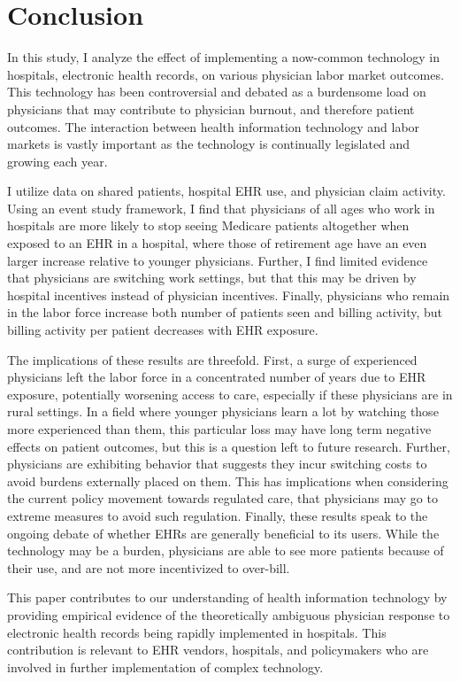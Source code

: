 \documentclass[11pt]{article}
\begin{document}
\section{Conclusion}

In this study, I analyze the effect of implementing a now-common technology in hospitals, electronic health records, on various physician labor market outcomes. This technology has been controversial and debated as a burdensome load on physicians that may contribute to physician burnout, and therefore patient outcomes. The interaction between health information technology and labor markets is vastly important as the technology is continually legislated and growing each year.

I utilize data on shared patients, hospital EHR use, and physician claim activity. Using an event study framework, I find that physicians of all ages who work in hospitals are more likely to stop seeing Medicare patients altogether when exposed to an EHR in a hospital, where those of retirement age have an even larger increase relative to younger physicians. Further, I find limited evidence that physicians are switching work settings, but that this may be driven by hospital incentives instead of physician incentives. Finally, physicians who remain in the labor force increase both number of patients seen and billing activity, but billing activity per patient decreases with EHR exposure. 

The implications of these results are threefold. First, a surge of experienced physicians left the labor force in a concentrated number of years due to EHR exposure, potentially worsening access to care, especially if these physicians are in rural settings. In a field where younger physicians learn a lot by watching those more experienced than them, this particular loss may have long term negative effects on patient outcomes, but this is a question left to future research. Further, physicians are exhibiting behavior that suggests they incur switching costs to avoid burdens externally placed on them. This has implications when considering the current policy movement towards regulated care, that physicians may go to extreme measures to avoid such regulation. Finally, these results speak to the ongoing debate of whether EHRs are generally beneficial to its users. While the technology may be a burden, physicians are able to see more patients because of their use, and are not more incentivized to over-bill. 

This paper contributes to our understanding of health information technology by providing empirical evidence of the theoretically ambiguous physician response to electronic health records being rapidly implemented in hospitals. This contribution is relevant to EHR vendors, hospitals, and policymakers who are involved in further implementation of complex technology. 
\end{document}

